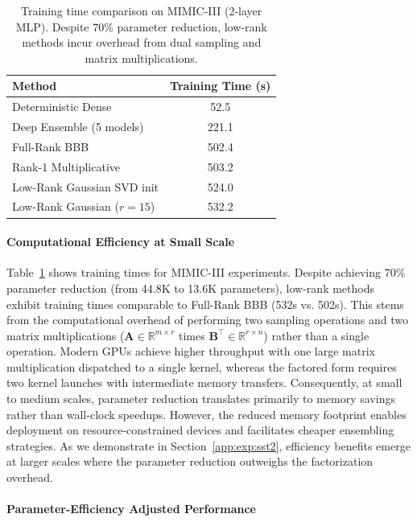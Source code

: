 \documentclass{article}
\theoremstyle{plain}
\theoremstyle{definition}
\theoremstyle{remark}
\begin{document}
\begin{table}[!ht]
\centering
\caption{Training time comparison on MIMIC-III (2-layer MLP). Despite 70\% parameter reduction, low-rank methods incur overhead from dual sampling and matrix multiplications.}
\label{tab:mimic_time}
\begin{tabular}{lc}
\toprule
\textbf{Method} & \textbf{Training Time (s)} \\
\midrule
Deterministic Dense & 52.5 \\
Deep Ensemble (5 models) & 221.1 \\
Full-Rank BBB & 502.4 \\
Rank-1 Multiplicative & 503.2 \\
Low-Rank Gaussian SVD init & 524.0 \\
Low-Rank Gaussian ($r=15$) & 532.2 \\
\bottomrule
\end{tabular}
\end{table}

\paragraph{Computational Efficiency at Small Scale}
Table~\ref{tab:mimic_time} shows training times for MIMIC-III experiments. Despite achieving 70\% parameter reduction (from 44.8K to 13.6K parameters), low-rank methods exhibit training times comparable to Full-Rank BBB (532s vs. 502s). This stems from the computational overhead of performing two sampling operations and two matrix multiplications ($\mathbf{A} \in \mathbb{R}^{m \times r}$ times $\mathbf{B}^\top \in \mathbb{R}^{r \times n}$) rather than a single operation. Modern GPUs achieve higher throughput with one large matrix multiplication dispatched to a single kernel, whereas the factored form requires two kernel launches with intermediate memory transfers. Consequently, at small to medium scales, parameter reduction translates primarily to memory savings rather than wall-clock speedups. However, the reduced memory footprint enables deployment on resource-constrained devices and facilitates cheaper ensembling strategies. As we demonstrate in Section~\ref{app:exp:sst2}, efficiency benefits emerge at larger scales where the parameter reduction outweighs the factorization overhead.
\paragraph{Parameter-Efficiency Adjusted Performance}
\end{document}
